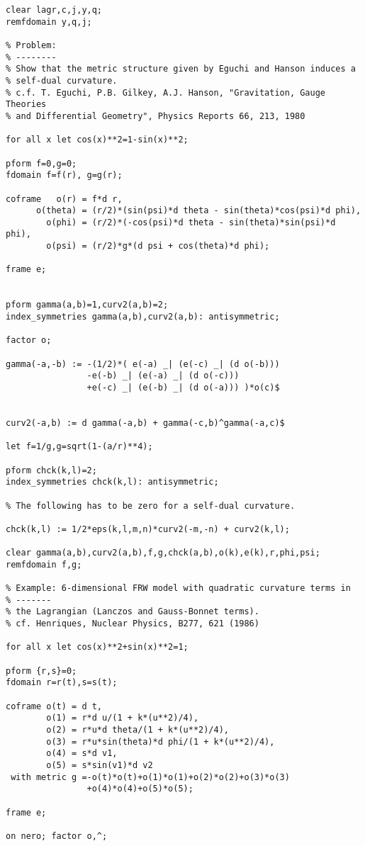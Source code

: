 {\begin{verbatim}
clear lagr,c,j,y,q;
remfdomain y,q,j;

% Problem:
% --------
% Show that the metric structure given by Eguchi and Hanson induces a
% self-dual curvature.
% c.f. T. Eguchi, P.B. Gilkey, A.J. Hanson, "Gravitation, Gauge Theories
% and Differential Geometry", Physics Reports 66, 213, 1980

for all x let cos(x)**2=1-sin(x)**2;

pform f=0,g=0;
fdomain f=f(r), g=g(r);

coframe   o(r) = f*d r,
      o(theta) = (r/2)*(sin(psi)*d theta - sin(theta)*cos(psi)*d phi),
        o(phi) = (r/2)*(-cos(psi)*d theta - sin(theta)*sin(psi)*d phi),
        o(psi) = (r/2)*g*(d psi + cos(theta)*d phi);

frame e;


pform gamma(a,b)=1,curv2(a,b)=2;
index_symmetries gamma(a,b),curv2(a,b): antisymmetric;

factor o;

gamma(-a,-b) := -(1/2)*( e(-a) _| (e(-c) _| (d o(-b)))
		        -e(-b) _| (e(-a) _| (d o(-c)))
		        +e(-c) _| (e(-b) _| (d o(-a))) )*o(c)$


curv2(-a,b) := d gamma(-a,b) + gamma(-c,b)^gamma(-a,c)$

let f=1/g,g=sqrt(1-(a/r)**4);

pform chck(k,l)=2;
index_symmetries chck(k,l): antisymmetric;

% The following has to be zero for a self-dual curvature.

chck(k,l) := 1/2*eps(k,l,m,n)*curv2(-m,-n) + curv2(k,l);

clear gamma(a,b),curv2(a,b),f,g,chck(a,b),o(k),e(k),r,phi,psi;
remfdomain f,g;

% Example: 6-dimensional FRW model with quadratic curvature terms in
% -------
% the Lagrangian (Lanczos and Gauss-Bonnet terms).
% cf. Henriques, Nuclear Physics, B277, 621 (1986)

for all x let cos(x)**2+sin(x)**2=1;

pform {r,s}=0;
fdomain r=r(t),s=s(t);

coframe o(t) = d t,
        o(1) = r*d u/(1 + k*(u**2)/4),
        o(2) = r*u*d theta/(1 + k*(u**2)/4),
        o(3) = r*u*sin(theta)*d phi/(1 + k*(u**2)/4),
        o(4) = s*d v1,
        o(5) = s*sin(v1)*d v2
 with metric g =-o(t)*o(t)+o(1)*o(1)+o(2)*o(2)+o(3)*o(3)
                +o(4)*o(4)+o(5)*o(5);

frame e;

on nero; factor o,^;


\end{verbatim}}
